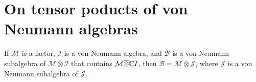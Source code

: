 \section{On tensor poducts of von Neumann algebras}
\cite{ge1996tensor}
\begin{theorem}
  If $\mathcal{M}$ is a factor, $\mathcal{I}$ is a von Neumann algebra,
  and $\mathcal{B}$ is a von Neumann subalgebra of $\mathcal{M}\overline{\otimes}\mathcal{I}$ that contains $\mathcal{M} \overline{\otimes} \mathbb{C} I$,
  then $\mathcal{B} = \mathcal{M} \overline{\otimes} \mathcal{J}$,
  where $\mathcal{J}$ is a von Neumann subalgebra of $\mathcal{J}$.
\end{theorem}


